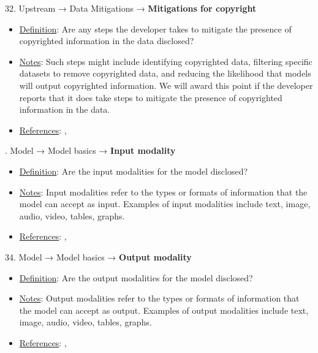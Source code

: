 32. Upstream → Data Mitigations → \textbf{Mitigations for copyright}
\vspace{-\parskip}
\begin{itemize}
	\item
	\underline{Definition}: Are any steps the developer takes to mitigate the presence of copyrighted information in the data disclosed?
	\item
	\underline{Notes}: Such steps might include identifying copyrighted data, filtering specific datasets to remove copyrighted data, and reducing the likelihood that models will output copyrighted information. We will award this point if the developer reports that it does take steps to mitigate the presence of copyrighted information in the data.
	\item
	\underline{References}: \citet{bandy2021addressing}, \citet{genlaw2023}
\end{itemize}


. Model → Model basics → \textbf{Input modality}
\vspace{-\parskip}
\begin{itemize}
	\item
	\underline{Definition}: Are the input modalities for the model disclosed?
	\item
	\underline{Notes}: Input modalities refer to the types or formats of information that the model can accept as input. Examples of input modalities include text, image, audio, video, tables, graphs.
	\item
	\underline{References}: \citet{mitchell2019model}, \citet{crisan2022interactive}
\end{itemize}


34. Model → Model basics → \textbf{Output modality}
\vspace{-\parskip}
\begin{itemize}
	\item
	\underline{Definition}: Are the output modalities for the model disclosed?
	\item
	\underline{Notes}: Output modalities refer to the types or formats of information that the model can accept as output. Examples of output modalities include text, image, audio, video, tables, graphs.
	\item
	\underline{References}: \citet{mitchell2019model}, \citet{crisan2022interactive}
\end{itemize}


